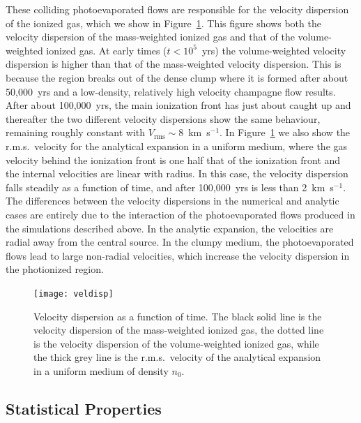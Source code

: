 \documentclass[useAMS,usenatbib]{mn2e}
\begin{document}
These colliding photoevaporated flows are responsible for the velocity
dispersion of the ionized gas, which we show in
Figure~\ref{fig:veldisp}. This figure shows both the velocity
dispersion of the mass-weighted ionized gas and that of the
volume-weighted ionized gas. At early times ($t < 10^5$~yrs) the
volume-weighted velocity dispersion is higher than that of the
mass-weighted velocity dispersion. This is because the \hii{} region
breaks out of the dense clump where it is formed after about
50,000~yrs and a low-density, relatively high velocity champagne flow
results. After about 100,000~yrs, the main ionization front has just
about caught up and thereafter the two different velocity dispersions
show the same behaviour, remaining roughly constant with
$V_\mathrm{rms} \sim 8$~km~s$^{-1}$. In Figure~\ref{fig:veldisp} we also show the
r.m.s.\ velocity for the analytical  expansion \citep{1978Spitzer} in a uniform
medium, where the gas velocity behind the ionization front is one half
that of the ionization front and the internal velocities are linear
with radius. In this case, the velocity dispersion falls steadily as a
function of time, and after 100,000~yrs is less than 2~km~s$^{-1}$. The
differences between the velocity dispersions in the numerical and analytic
cases are entirely due to the interaction of the photoevaporated
flows produced in the simulations described above. In the analytic expansion, the velocities are radial
away from the central source. In the clumpy medium, the
photoevaporated flows lead to large non-radial velocities, which increase
the velocity dispersion in the photionized region.
\begin{figure}
\centering
\texttt{[image: veldisp]}
\caption{Velocity dispersion as a function of time. The black solid
  line is the velocity dispersion of the mass-weighted ionized gas,
  the dotted line is the velocity dispersion of the volume-weighted
  ionized gas, while the thick grey line is the r.m.s.\ velocity of
  the analytical expansion \citep{1978Spitzer} in a uniform medium of density $n_0$. }
\label{fig:veldisp}
\end{figure}

\subsection{Statistical Properties}
\label{subsec:statprop}
\end{document}
